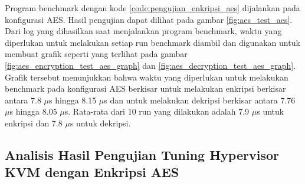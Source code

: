 Program benchmark dengan kode \ref{code:pengujian_enkripsi_aes} dijalankan pada konfigurasi AES. Hasil pengujian dapat dilihat pada gambar \ref{fig:aes_test_aes}. Dari log yang dihasilkan saat menjalankan program benchmark, waktu yang diperlukan untuk melakukan setiap run benchmark diambil dan digunakan untuk membuat grafik seperti yang terlihat pada gambar \ref{fig:aes_encryption_test_aes_graph} dan \ref{fig:aes_decryption_test_aes_graph}. Grafik tersebut menunjukkan bahwa waktu yang diperlukan untuk melakukan benchmark pada konfigurasi AES berkisar untuk melakukan enkripsi berkisar antara 7.8 $\mu$s hingga 8.15 $\mu$s dan untuk melakukan dekripsi berkisar antara 7.76 $\mu$s hingga 8.05 $\mu$s. Rata-rata dari 10 run yang dilakukan adalah 7.9 $\mu$s untuk enkripsi dan 7.8 $\mu$s untuk dekripsi.

\subsection{Analisis Hasil Pengujian Tuning Hypervisor KVM dengan Enkripsi AES}


